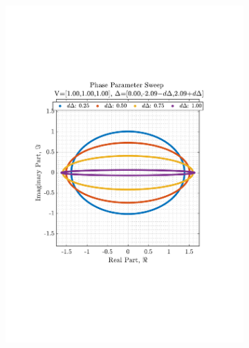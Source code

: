 \documentclass[12pt]{article}
\numberwithin{equation}{section}
\begin{document}
\begin{figure}[H]
				\begin{subfigure}{0.45\textwidth}
					\centering
					\includegraphics[trim={2.2cm 6.8cm 3.00cm  6.2cm}, clip, width=\textwidth]{../MATLAB/figures/q3_1c_fig03.pdf} 
					\captionsetup{justification=centering}
				\end{subfigure}
				\begin{subfigure}{0.45\textwidth}
					\centering

\end{subfigure}
\end{figure}
\end{document}
